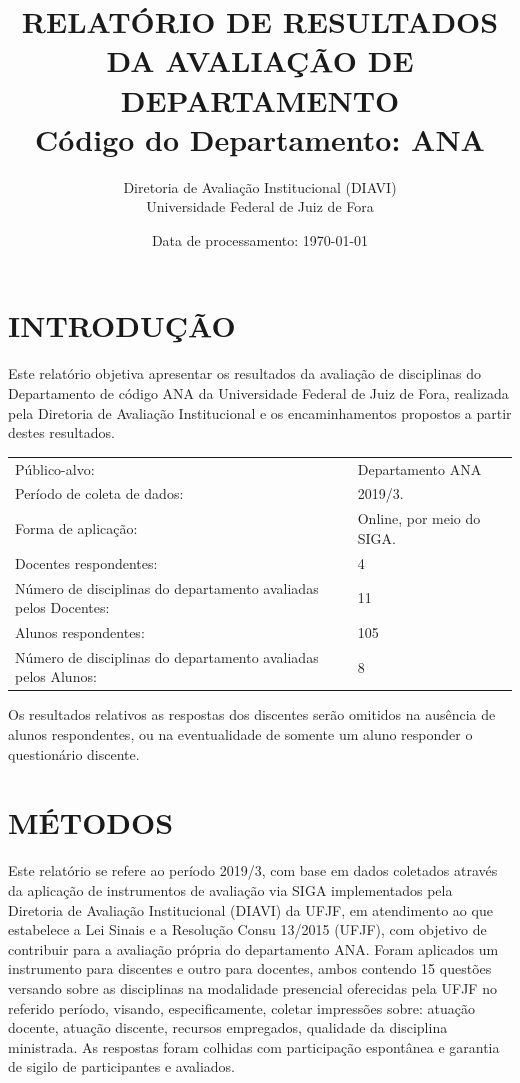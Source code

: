 \documentclass[a4paper,10pt]{article}
\date{Data de processamento: \today}
\begin{document}
\author{Diretoria de Avaliação Institucional (DIAVI) \\ Universidade Federal de Juiz de Fora}

\title{RELATÓRIO DE RESULTADOS DA AVALIAÇÃO DE DEPARTAMENTO\\ Código do Departamento: ANA}
\maketitle
\section{INTRODUÇÃO}
Este relatório objetiva apresentar os resultados da avaliação de disciplinas do Departamento     de código ANA da Universidade Federal de Juiz de Fora, realizada pela     Diretoria de Avaliação Institucional e os encaminhamentos propostos a     partir destes resultados.

\begin{center}
\begin{tabularx}{\linewidth}{X|l}

Público-alvo:& Departamento  ANA\\

Período de coleta de dados:& 2019/3.\\

Forma de aplicação:& Online, por meio do SIGA.\\

Docentes respondentes:& 4\\

Número de disciplinas do departamento avaliadas pelos Docentes:& 11\\

Alunos   respondentes:& 105\\

Número de disciplinas do departamento  avaliadas pelos   Alunos:& 8\\
\end{tabularx}
\end{center}

Os resultados relativos as respostas dos discentes serão omitidos na ausência de alunos respondentes, ou na eventualidade de somente um aluno responder o questionário discente.
\section{MÉTODOS}
Este relatório se refere ao período 2019/3, com base em dados     coletados através da aplicação de instrumentos de avaliação via SIGA     implementados pela Diretoria de Avaliação Institucional (DIAVI) da UFJF, em atendimento     ao que estabelece a Lei Sinais e a Resolução Consu 13/2015 (UFJF),     com objetivo de contribuir para a avaliação própria do departamento ANA.    Foram aplicados um instrumento para discentes e outro para docentes, ambos contendo     15 questões versando sobre as disciplinas na modalidade presencial oferecidas pela UFJF no     referido período, visando, especificamente, coletar impressões sobre: atuação docente, atuação discente,     recursos empregados, qualidade da disciplina ministrada.     As respostas foram colhidas      com participação espontânea e garantia de    sigilo de participantes e avaliados.
\end{document}

